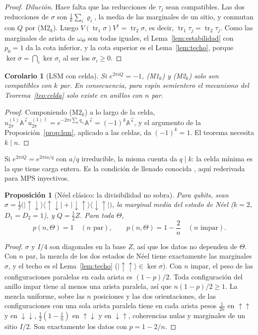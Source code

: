 \documentclass[11pt,a4paper]{article}
\newtheorem{proposicion}[teorema]{Proposición}
\newtheorem{corolario}[teorema]{Corolario}
\theoremstyle{remark}
\newcommand{\tr}{\operatorname{tr}}
\newcommand{\ket}[1]{|#1\rangle}
\newcommand{\bra}[1]{\langle #1|}
\begin{document}
\begin{proof}
\emph{Dilución.} Hace falta que las reducciones de $\tau_j$ sean compatibles. Las dos reducciones
de $\sigma$ son $\tfrac1k\sum_i\varrho_i$, la media de las marginales de un sitio, y conmutan con
$Q$ por (M2$_k$). Luego $V(\tr_1\sigma)V^\dagger=\tr_2\sigma$, es decir, $\tr_1\tau_j=\tr_2\tau_j$.
Como las marginales de arista de $\omega_\Theta$ son todas iguales, el Lema~\ref{lem:estabilidad} con
$p_0=1$ da la cota inferior, y la cota superior es el Lema~\ref{lem:techo}, porque $\ker\sigma=\bigcap_i\ker\sigma_i$ al ser los $\sigma_i\ge0$.
\end{proof}

\begin{corolario}[LSM con celda]\label{cor:lsmk}
Si $e^{2\pi iQ}=-1$, (M1$_k$) y (M2$_k$) solo son compatibles con $k$ par. En consecuencia, para
espín semientero el mecanismo del Teorema~\ref{teo:celda} solo existe en anillos con $n$ par.
\end{corolario}

\begin{proof}
Componiendo (M2$_k$) a lo largo de la celda,
$u^{(1)}_{2\pi}\mathbb A^{\vec s}u^{(1)\dagger}_{2\pi}=e^{-2\pi i\sum_lq_{s_l}}\mathbb A^{\vec s}=(-1)^k\mathbb A^{\vec s}$,
y el argumento de la Proposición~\ref{prop:lsm}, aplicado a las celdas, da $(-1)^k=1$. El
teorema necesita $k\mid n$.
\end{proof}

Si $e^{2\pi iQ}=e^{2\pi ia/q}$ con $a/q$ irreducible, la misma cuenta da $q\mid k$: la celda mínima es la que tiene carga entera. Es la condición de
llenado conocida \cite{oya,wpvz}, aquí rederivada para MPS inyectivos.

\begin{proposicion}[Néel clásico: la divisibilidad no sobra]\label{prop:neelclas}
Para qubits, sean $\sigma=\tfrac12\big(\ket{\uparrow\downarrow}\bra{\uparrow\downarrow}+
\ket{\downarrow\uparrow}\bra{\downarrow\uparrow}\big)$, la marginal media del estado de Néel ($k=2$,
$D_1=D_2=1$), y $Q=\tfrac12Z$. Para toda $\Theta$,
\[
  p(n,\Theta)=1\quad(n\text{ par}),\qquad p(n,\Theta)=1-\frac2n\quad(n\text{ impar}).
\]
\end{proposicion}

\begin{proof}
$\sigma$ y $I/4$ son diagonales en la base $Z$, así que los datos no dependen de $\Theta$. Con $n$
par, la mezcla de los dos estados de Néel tiene exactamente las marginales $\sigma$, y el techo es
el Lema~\ref{lem:techo} ($\ket{\uparrow\uparrow}\in\ker\sigma$). Con $n$ impar, el peso de las
configuraciones paralelas en cada arista es $(1-p)/2$. Toda configuración del anillo impar tiene
al menos una arista paralela, así que $n(1-p)/2\ge1$. La mezcla uniforme, sobre las $n$ posiciones
y las dos orientaciones, de las configuraciones con una sola arista paralela tiene en cada arista
pesos $\tfrac1{2n}$ en $\uparrow\uparrow$ y en $\downarrow\downarrow$, $\tfrac12(1-\tfrac1n)$ en
$\uparrow\downarrow$ y en $\downarrow\uparrow$, coherencias nulas y marginales de un sitio $I/2$.
Son exactamente los datos con $p=1-2/n$.
\end{proof}
\end{document}
